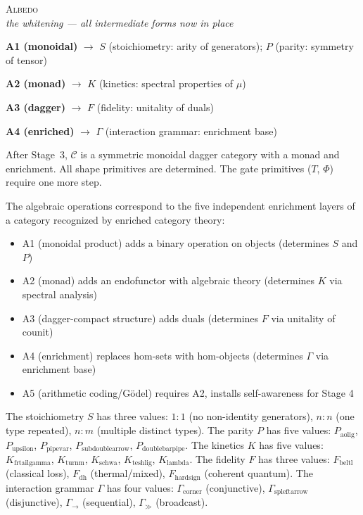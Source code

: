 \documentclass[12pt,a4paper]{article}
\begin{document}
\begin{center}
\vspace{0.5em}
{\large\textsc{Albedo}}
\\[4pt]
{\small\itshape the whitening --- all intermediate forms now in place}
\vspace{0.4em}
\end{center}

\noindent\textbf{A1 (monoidal)} $\to$ $S$ (stoichiometry: arity of generators); $P$ (parity: symmetry of tensor)

\noindent\textbf{A2 (monad)} $\to$ $K$ (kinetics: spectral properties of $\mu$)

\noindent\textbf{A3 (dagger)} $\to$ $F$ (fidelity: unitality of duals)

\noindent\textbf{A4 (enriched)} $\to$ $\Gamma$ (interaction grammar: enrichment base)

After Stage~3, $\mathcal{C}$ is a symmetric monoidal dagger category with a monad and enrichment. All shape primitives are determined. The gate primitives ($T$, $\Phi$) require one more step.

The algebraic operations correspond to the five independent enrichment layers of a category recognized by enriched category theory:
\begin{itemize}
    \item A1 (monoidal product) adds a binary operation on objects (determines $S$ and $P$)
    \item A2 (monad) adds an endofunctor with algebraic theory (determines $K$ via spectral analysis)
    \item A3 (dagger-compact structure) adds duals (determines $F$ via unitality of counit)
    \item A4 (enrichment) replaces hom-sets with hom-objects (determines $\Gamma$ via enrichment base)
    \item A5 (arithmetic coding/G\"odel) requires A2, installs self-awareness for Stage 4
\end{itemize}

The stoichiometry $S$ has three values: $1{:}1$ (no non-identity generators), $n{:}n$ (one type repeated), $n{:}m$ (multiple distinct types). The parity $P$ has five values: $P_{\text{aolig}}$, $P_{\text{upsilon}}$, $P_{\text{pipevar}}$, $P_{\text{subdoublearrow}}$, $P_{\text{doublebarpipe}}$. The kinetics $K$ has five values: $K_{\text{frtailgamma}}$, $K_{\text{turnm}}$, $K_{\text{schwa}}$, $K_{\text{teshlig}}$, $K_{\text{lambda}}$. The fidelity $F$ has three values: $F_{\text{beltl}}$ (classical loss), $F_{\text{dh}}$ (thermal/mixed), $F_{\text{hardsign}}$ (coherent quantum). The interaction grammar $\Gamma$ has four values: $\Gamma_{\text{corner}}$ (conjunctive), $\Gamma_{\text{spleftarrow}}$ (disjunctive), $\Gamma_\to$ (sequential), $\Gamma_{\gg}$ (broadcast).
\end{document}
